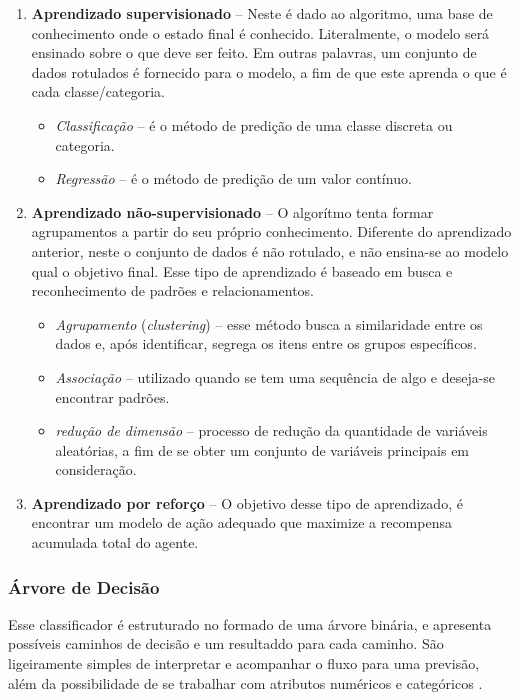 \begin{enumerate}
    \item \textbf{Aprendizado supervisionado} -- Neste é dado ao algoritmo, uma base de conhecimento onde o estado final é conhecido. Literalmente, o modelo será ensinado sobre o que deve ser feito.
    Em outras palavras, um conjunto de dados rotulados é fornecido para o modelo, a fim de que este aprenda o que é cada classe/categoria.
    \begin{itemize}
        \item \textit{Classificação} -- é o método de predição de uma classe discreta ou categoria. 
        
        \item \textit{Regressão} -- é o método de predição de um valor contínuo.
    \end{itemize}
    
    \item \textbf{Aprendizado não-supervisionado} -- O algorítmo tenta formar agrupamentos a partir do seu próprio conhecimento. Diferente do aprendizado anterior, neste o conjunto de dados é não rotulado, e não ensina-se ao modelo qual o objetivo final. Esse tipo de aprendizado é baseado em busca e reconhecimento de padrões e relacionamentos.
    
    \begin{itemize}
        \item \textit{Agrupamento} (\textit{clustering}) -- esse método busca a similaridade entre os dados e, após identificar, segrega os itens entre os grupos específicos.
        
        \item \textit{Associação} -- utilizado quando se tem uma sequência de algo e deseja-se encontrar padrões.
        
        \item \textit{redução de dimensão} -- processo de redução da quantidade de variáveis aleatórias, a fim de se obter um conjunto de variáveis principais em consideração.
    \end{itemize}

    \item \textbf{Aprendizado por reforço} -- O objetivo desse tipo de aprendizado, é encontrar um modelo de ação adequado que maximize a recompensa acumulada total do agente.
    
\end{enumerate}

\subsubsection*{Árvore de Decisão}
Esse classificador é estruturado no formado de uma árvore binária, e apresenta possíveis caminhos de decisão e um resultaddo para cada caminho. São ligeiramente simples de interpretar e acompanhar o fluxo para uma previsão, além da possibilidade de se trabalhar com atributos numéricos e categóricos \cite{grus2019data}.

